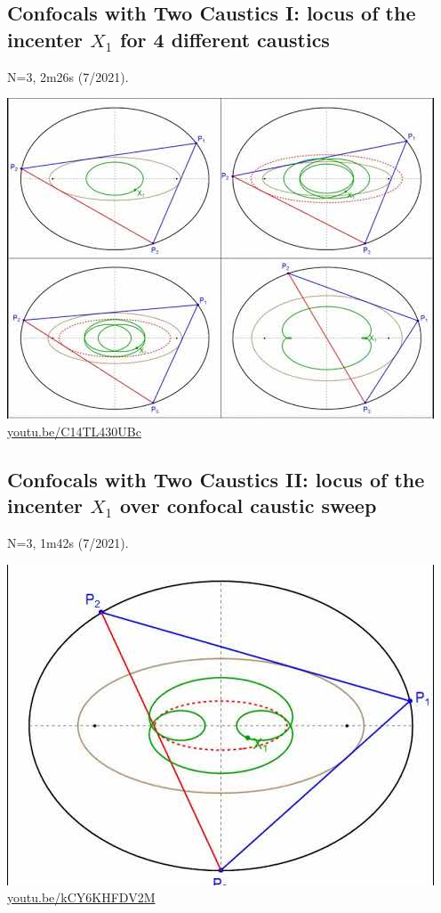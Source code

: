 \documentclass[12pt]{amsart}
\begin{document}
\subsection{Confocals with Two Caustics I: locus of the incenter $X_{1}$ for 4 different caustics}
\label{vid:C14TL430UBc}
\noindent N=3, 2m26s (7/2021). 
\begin{center}\includegraphics[width=.5\textwidth]{pics/C14TL430UBc.jpg} \\ 
\href{https://youtu.be/C14TL430UBc}{\url{youtu.be/C14TL430UBc}}\end{center}
% 

\subsection{Confocals with Two Caustics II: locus of the incenter $X_{1}$ over confocal caustic sweep}
\label{vid:kCY6KHFDV2M}
\noindent N=3, 1m42s (7/2021). 
\begin{center}\includegraphics[width=.5\textwidth]{pics/kCY6KHFDV2M.jpg} \\ 
\href{https://youtu.be/kCY6KHFDV2M}{\url{youtu.be/kCY6KHFDV2M}}\end{center}
% 
\end{document}

